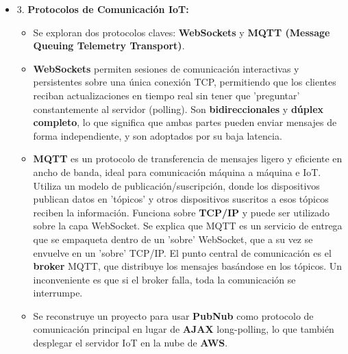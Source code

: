 \documentclass{report}
\begin{document}
\begin{itemize}
\item 3. \textbf{Protocolos de Comunicación IoT:}
\begin{itemize}
    \item Se exploran dos protocolos claves: \textbf{WebSockets} y \textbf{MQTT (Message Queuing Telemetry Transport)}.
    \item \textbf{WebSockets} permiten sesiones de comunicación interactivas y persistentes sobre una única conexión TCP, 
    permitiendo que los clientes reciban actualizaciones en tiempo real sin tener que 'preguntar' constantemente al servidor 
    (polling). Son \textbf{bidireccionales} y \textbf{dúplex completo}, lo que significa que ambas partes pueden enviar mensajes 
    de forma independiente, y son adoptados por su baja latencia.
    \item \textbf{MQTT} es un protocolo de transferencia de mensajes ligero y eficiente 
    en ancho de banda, ideal para comunicación máquina a máquina e IoT. Utiliza un modelo de publicación/suscripción, donde los 
    dispositivos publican datos en 'tópicos' y otros dispositivos suscritos a esos tópicos reciben la información. Funciona 
    sobre \textbf{TCP/IP} y puede ser utilizado sobre la capa WebSocket. Se explica que MQTT es un servicio de entrega que se 
    empaqueta dentro de un 'sobre' WebSocket, que a su vez se envuelve en un 'sobre' TCP/IP. El punto central de comunicación 
    es el \textbf{broker} MQTT, que distribuye los mensajes basándose en los tópicos. Un inconveniente es que si el broker falla, 
    toda la comunicación se interrumpe.
    \item Se reconstruye un proyecto para usar \textbf{PubNub} como protocolo de comunicación principal en lugar de 
    \textbf{AJAX} long-polling, lo que también desplegar el servidor IoT en la nube de \textbf{AWS}.
\end{itemize}


\end{itemize}
\end{document}
